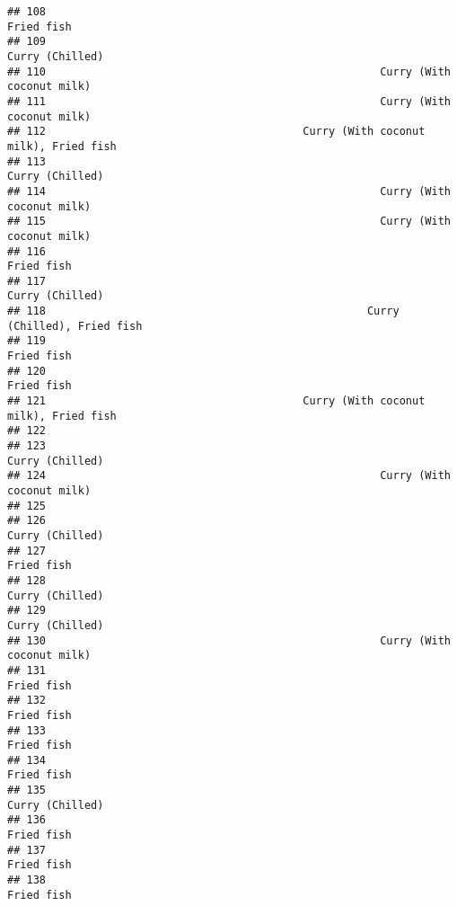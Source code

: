 \documentclass[
]{article}
\begin{document}
\begin{verbatim}
## 108                                                                   Fried fish
## 109                                                              Curry (Chilled)
## 110                                                    Curry (With coconut milk)
## 111                                                    Curry (With coconut milk)
## 112                                        Curry (With coconut milk), Fried fish
## 113                                                              Curry (Chilled)
## 114                                                    Curry (With coconut milk)
## 115                                                    Curry (With coconut milk)
## 116                                                                   Fried fish
## 117                                                              Curry (Chilled)
## 118                                                  Curry (Chilled), Fried fish
## 119                                                                   Fried fish
## 120                                                                   Fried fish
## 121                                        Curry (With coconut milk), Fried fish
## 122                                                                             
## 123                                                              Curry (Chilled)
## 124                                                    Curry (With coconut milk)
## 125                                                                             
## 126                                                              Curry (Chilled)
## 127                                                                   Fried fish
## 128                                                              Curry (Chilled)
## 129                                                              Curry (Chilled)
## 130                                                    Curry (With coconut milk)
## 131                                                                   Fried fish
## 132                                                                   Fried fish
## 133                                                                   Fried fish
## 134                                                                   Fried fish
## 135                                                              Curry (Chilled)
## 136                                                                   Fried fish
## 137                                                                   Fried fish
## 138                                                                   Fried fish

\end{verbatim}
\end{document}
